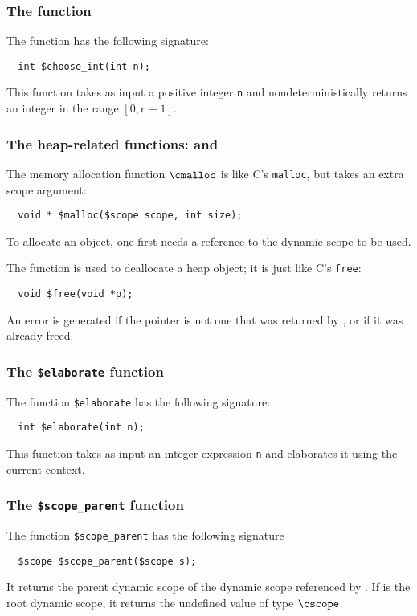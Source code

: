 \subsubsection{The \cchooseint{} function}
\label{subsubsec:chooseint}
The function \cchooseint{} has the following signature:
\begin{verbatim}
  int $choose_int(int n);
\end{verbatim}
This function takes as input a positive integer \texttt{n} and
nondeterministically returns an integer in the range
$[0,\texttt{n}-1]$.

\subsubsection{The heap-related functions: \cmalloc{} and \cfree}
\label{subsubsec:mallocandfree}

The memory allocation function $\cmalloc$ is like C's \texttt{malloc}, but takes
an extra scope argument:
\begin{verbatim}
  void * $malloc($scope scope, int size);
\end{verbatim}
To allocate an object, one first needs a reference to the dynamic scope to be used.

The function \cfree{} is used to deallocate a heap object;
it is just like C's \texttt{free}:
\begin{verbatim}
  void $free(void *p);
\end{verbatim}
An error is generated if the pointer is not one that was returned by
\cmalloc, or if it was already freed.

\subsubsection{The \texttt{\$elaborate} function}
The function \texttt{\$elaborate} has the following signature:
\begin{verbatim}
  int $elaborate(int n);
\end{verbatim}
This function takes as input an integer expression \texttt{n} and
elaborates it using the current context.

\subsubsection{The \texttt{\$scope\_parent} function}
The function \texttt{\$scope\_parent} has the following signature
\begin{verbatim}
  $scope $scope_parent($scope s);
\end{verbatim}
It returns the parent dynamic scope of the dynamic scope referenced by
.  If  is the root dynamic scope, it returns the undefined
value of type $\cscope$.

